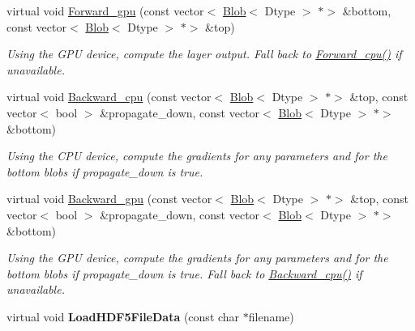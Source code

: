 \begin{DoxyCompactItemize}
\mbox{\label{classcaffe_1_1_h_d_f5_data_layer_a9147be08e6e0c9b0300ddad220903fc6}} 
virtual void \mbox{\hyperlink{classcaffe_1_1_h_d_f5_data_layer_a9147be08e6e0c9b0300ddad220903fc6}{Forward\+\_\+gpu}} (const vector$<$ \mbox{\hyperlink{classcaffe_1_1_blob}{Blob}}$<$ Dtype $>$ $\ast$$>$ \&bottom, const vector$<$ \mbox{\hyperlink{classcaffe_1_1_blob}{Blob}}$<$ Dtype $>$ $\ast$$>$ \&top)
\begin{DoxyCompactList}\small\item\em Using the G\+PU device, compute the layer output. Fall back to \mbox{\hyperlink{classcaffe_1_1_h_d_f5_data_layer_a6ee944e4d80a76a13e955c36f33a2cee}{Forward\+\_\+cpu()}} if unavailable. \end{DoxyCompactList}\item 
\mbox{\label{classcaffe_1_1_h_d_f5_data_layer_ab2a3379c83003ab3fa19848fbc57d30a}} 
virtual void \mbox{\hyperlink{classcaffe_1_1_h_d_f5_data_layer_ab2a3379c83003ab3fa19848fbc57d30a}{Backward\+\_\+cpu}} (const vector$<$ \mbox{\hyperlink{classcaffe_1_1_blob}{Blob}}$<$ Dtype $>$ $\ast$$>$ \&top, const vector$<$ bool $>$ \&propagate\+\_\+down, const vector$<$ \mbox{\hyperlink{classcaffe_1_1_blob}{Blob}}$<$ Dtype $>$ $\ast$$>$ \&bottom)
\begin{DoxyCompactList}\small\item\em Using the C\+PU device, compute the gradients for any parameters and for the bottom blobs if propagate\+\_\+down is true. \end{DoxyCompactList}\item 
\mbox{\label{classcaffe_1_1_h_d_f5_data_layer_af8bba12ab79b135944ab57ac58ff2128}} 
virtual void \mbox{\hyperlink{classcaffe_1_1_h_d_f5_data_layer_af8bba12ab79b135944ab57ac58ff2128}{Backward\+\_\+gpu}} (const vector$<$ \mbox{\hyperlink{classcaffe_1_1_blob}{Blob}}$<$ Dtype $>$ $\ast$$>$ \&top, const vector$<$ bool $>$ \&propagate\+\_\+down, const vector$<$ \mbox{\hyperlink{classcaffe_1_1_blob}{Blob}}$<$ Dtype $>$ $\ast$$>$ \&bottom)
\begin{DoxyCompactList}\small\item\em Using the G\+PU device, compute the gradients for any parameters and for the bottom blobs if propagate\+\_\+down is true. Fall back to \mbox{\hyperlink{classcaffe_1_1_h_d_f5_data_layer_ab2a3379c83003ab3fa19848fbc57d30a}{Backward\+\_\+cpu()}} if unavailable. \end{DoxyCompactList}\item 
\mbox{\label{classcaffe_1_1_h_d_f5_data_layer_aa5f8704a6fabd98d01b4f2f891fd5668}} 
virtual void {\bfseries Load\+H\+D\+F5\+File\+Data} (const char $\ast$filename)
\end{DoxyCompactItemize}
